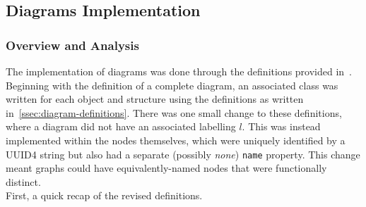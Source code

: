 \subsection{Diagrams Implementation}

    \subsubsection{Overview and Analysis}\label{sssec:diagram-implementation-analysis}
        The implementation of diagrams was done through the definitions provided in~\cite{solo-diagrams}.
        Beginning with the definition of a complete diagram, an associated class was written for each object and structure using the definitions as written in~\ref{ssec:diagram-definitions}.
        There was one small change to these definitions, where a diagram did not have an associated labelling $l$.
        This was instead implemented within the nodes themselves, which were uniquely identified by a UUID4 string but also had a separate (possibly \textit{none}) \texttt{name} property.
        This change meant graphs could have equivalently-named nodes that were functionally distinct. \\

        First, a quick recap of the revised definitions.

